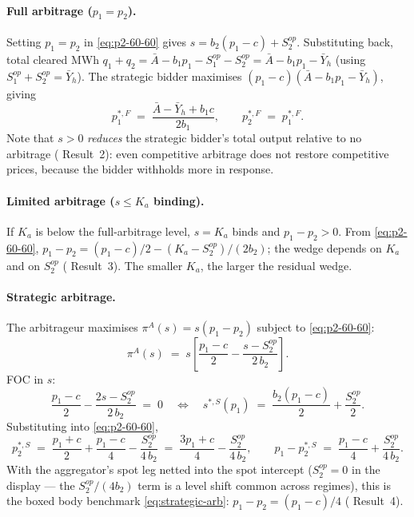 \documentclass[11pt,a4paper]{article}
\theoremstyle{definition}
\theoremstyle{remark}
\theoremstyle{plain}
\begin{document}
\paragraph{Full arbitrage ($p_1 = p_2$).} Setting $p_1 = p_2$ in \eqref{eq:p2-60-60} gives $s = b_2(p_1 - c) + S^{op}_2$. Substituting back, total cleared MWh $q_1 + q_2 = \bar A - b_1 p_1 - S^{op}_1 - S^{op}_2 = \bar A - b_1 p_1 - \bar Y_h$ (using $S^{op}_1 + S^{op}_2 = \bar Y_h$). The strategic bidder maximises $(p_1 - c)(\bar A - b_1 p_1 - \bar Y_h)$, giving
\begin{equation}
p_1^{*,F} \;=\; \frac{\bar A - \bar Y_h + b_1 c}{2 b_1}, \qquad p_2^{*,F} \;=\; p_1^{*,F}.
\label{eq:p1-60-60-full}
\end{equation}
Note that $s > 0$ \emph{reduces} the strategic bidder's total output relative to no arbitrage (\citeauthor{ito_reguant_2016} Result~2): even competitive arbitrage does not restore competitive prices, because the bidder withholds more in response.

\paragraph{Limited arbitrage ($s \le K_a$ binding).} If $K_a$ is below the full-arbitrage level, $s = K_a$ binds and $p_1 - p_2 > 0$. From \eqref{eq:p2-60-60}, $p_1 - p_2 = (p_1 - c)/2 - (K_a - S^{op}_2)/(2 b_2)$; the wedge depends on $K_a$ and on $S^{op}_2$ (\citeauthor{ito_reguant_2016} Result~3). The smaller $K_a$, the larger the residual wedge.

\paragraph{Strategic arbitrage.} The arbitrageur maximises $\pi^A(s) = s(p_1 - p_2)$ subject to \eqref{eq:p2-60-60}:
\[
\pi^A(s) \;=\; s\!\left[\frac{p_1 - c}{2} - \frac{s - S^{op}_2}{2\, b_2}\right].
\]
FOC in $s$:
\[
\frac{p_1 - c}{2} - \frac{2 s - S^{op}_2}{2\, b_2} \;=\; 0
\quad\Longleftrightarrow\quad
s^{*,S}(p_1) \;=\; \frac{b_2 (p_1 - c)}{2} + \frac{S^{op}_2}{2}.
\]
Substituting into \eqref{eq:p2-60-60},
\[
p_2^{*,S} \;=\; \frac{p_1 + c}{2} + \frac{p_1 - c}{4} - \frac{S^{op}_2}{4\, b_2} \;=\; \frac{3 p_1 + c}{4} - \frac{S^{op}_2}{4\, b_2},
\qquad
p_1 - p_2^{*,S} \;=\; \frac{p_1 - c}{4} + \frac{S^{op}_2}{4\, b_2}.
\]
With the aggregator's spot leg netted into the spot intercept ($S^{op}_2 = 0$ in the display --- the $S^{op}_2/(4 b_2)$ term is a level shift common across regimes), this is the boxed body benchmark \eqref{eq:strategic-arb}: $p_1 - p_2 = (p_1 - c)/4$ (\citeauthor{ito_reguant_2016} Result~4).
\end{document}

